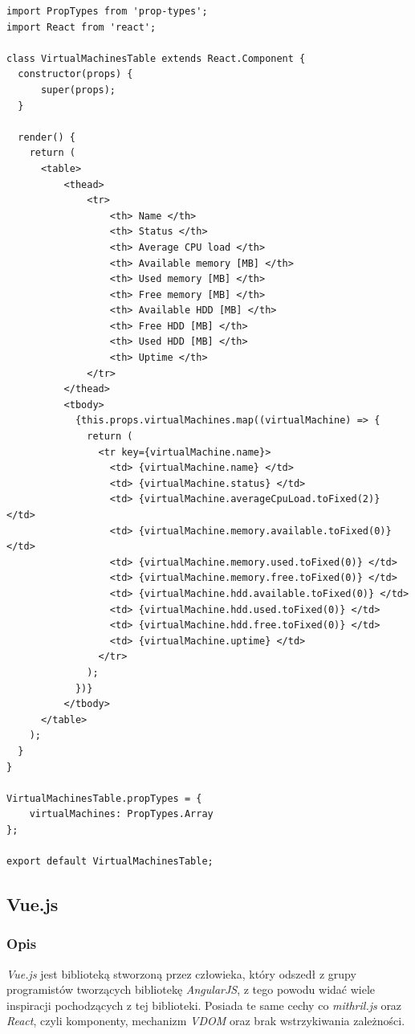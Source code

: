\documentclass[polish, twoside, 12pt]{mwart}
\begin{document}
\begin{lstlisting}[caption=Komponent tabeli]
import PropTypes from 'prop-types'; 
import React from 'react';

class VirtualMachinesTable extends React.Component {
  constructor(props) {
      super(props);
  }

  render() {
    return (
      <table>
          <thead>
              <tr>
                  <th> Name </th>
                  <th> Status </th>
                  <th> Average CPU load </th>
                  <th> Available memory [MB] </th>
                  <th> Used memory [MB] </th>
                  <th> Free memory [MB] </th>
                  <th> Available HDD [MB] </th>
                  <th> Free HDD [MB] </th>
                  <th> Used HDD [MB] </th>
                  <th> Uptime </th>
              </tr>
          </thead>
          <tbody>
            {this.props.virtualMachines.map((virtualMachine) => {
              return (
                <tr key={virtualMachine.name}>
                  <td> {virtualMachine.name} </td>
                  <td> {virtualMachine.status} </td>
                  <td> {virtualMachine.averageCpuLoad.toFixed(2)} </td>
                  <td> {virtualMachine.memory.available.toFixed(0)} </td>
                  <td> {virtualMachine.memory.used.toFixed(0)} </td>
                  <td> {virtualMachine.memory.free.toFixed(0)} </td>
                  <td> {virtualMachine.hdd.available.toFixed(0)} </td>
                  <td> {virtualMachine.hdd.used.toFixed(0)} </td>
                  <td> {virtualMachine.hdd.free.toFixed(0)} </td>
                  <td> {virtualMachine.uptime} </td>
                </tr>
              );
            })}
          </tbody>
      </table>
    );
  }
}

VirtualMachinesTable.propTypes = {
    virtualMachines: PropTypes.Array
};

export default VirtualMachinesTable;
\end{lstlisting}

\subsection{Vue.js}

\subsubsection{Opis}

\emph{Vue.js} jest biblioteką stworzoną przez człowieka, który odszedł z grupy programistów tworzących bibliotekę \emph{AngularJS}, z tego powodu widać wiele inspiracji pochodzących z tej biblioteki.
Posiada te same cechy co \emph{mithril.js} oraz \emph{React}, czyli komponenty, mechanizm \emph{VDOM} oraz brak wstrzykiwania zależności.
\end{document}
